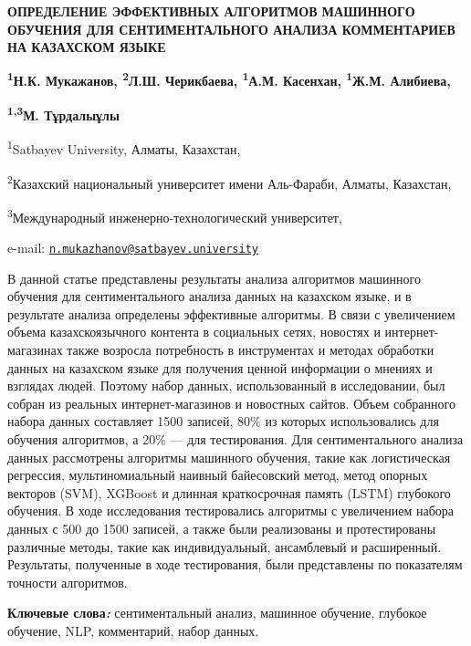 \begin{articleheader}
{\bfseries ОПРЕДЕЛЕНИЕ ЭФФЕКТИВНЫХ АЛГОРИТМОВ МАШИННОГО ОБУЧЕНИЯ ДЛЯ
СЕНТИМЕНТАЛЬНОГО АНАЛИЗА КОММЕНТАРИЕВ НА КАЗАХСКОМ ЯЗЫКЕ}

{\bfseries \textsuperscript{1}Н.К. Мукажанов\textsuperscript{\envelope },
\textsuperscript{2}Л.Ш. Черикбаева, \textsuperscript{1}А.М. Касенхан,
\textsuperscript{1}Ж.М. Алибиева,}

{\bfseries \textsuperscript{1,3}М. Тұрдалыұлы}
\end{articleheader}

\begin{affiliation}
\textsuperscript{1}Satbayev University, Алматы, Казахстан,

\textsuperscript{2}Казахский национальный университет имени Аль-Фараби,
Алматы, Казахстан,

\textsuperscript{3}Международный инженерно-технологический университет,

e-mail:
\href{mailto:n.mukazhanov@satbayev.university}{\nolinkurl{n.mukazhanov@satbayev.university}}
\end{affiliation}

В данной статье представлены результаты анализа алгоритмов машинного
обучения для сентиментального анализа данных на казахском языке, и в
результате анализа определены эффективные алгоритмы. В связи с
увеличением объема казахскоязычного контента в социальных сетях,
новостях и интернет-магазинах также возросла потребность в инструментах
и методах обработки данных на казахском языке для получения ценной
информации о мнениях и взглядах людей. Поэтому набор данных,
использованный в исследовании, был собран из реальных интернет-магазинов
и новостных сайтов. Объем собранного набора данных составляет 1500
записей, 80\% из которых использовались для обучения алгоритмов, а 20\%
--- для тестирования. Для сентиментального анализа данных рассмотрены
алгоритмы машинного обучения, такие как логистическая регрессия,
мультиномиальный наивный байесовский метод, метод опорных векторов
(SVM), XGBoost и длинная краткосрочная память (LSTM) глубокого обучения.
В ходе исследования тестировались алгоритмы с увеличением набора данных
с 500 до 1500 записей, а также были реализованы и протестированы
различные методы, такие как индивидуальный, ансамблевый и расширенный.
Результаты, полученные в ходе тестирования, были представлены по
показателям точности алгоритмов.

{\bfseries Ключевые слова\emph{:}} сентиментальный анализ, машинное
обучение, глубокое обучение, NLP, комментарий, набор данных.

